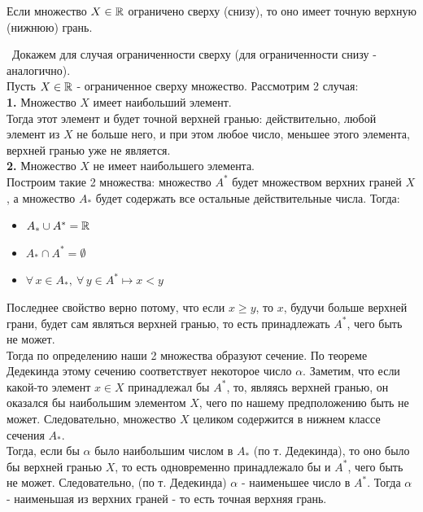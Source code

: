 \begin{theorem}
    Если множество \(X\in\mathbb{R}\) ограничено сверху (снизу), 
    то оно имеет точную верхную (нижнюю) грань.

    \vspace{2mm}

    \proofname~Докажем для случая ограниченности сверху (для ограниченности снизу - аналогично). \\
    Пусть \(X\in\mathbb{R}\) - ограниченное сверху множество. Рассмотрим 2 случая: \\
        \indent \textbf{1.} Множество \(X\) имеет наибольший элемент. \\
        Тогда этот элемент и будет точной верхней гранью: действительно,
        любой элемент из \(X\) не больше него, и при этом любое число,
        меньшее этого элемента, верхней гранью уже не является.\\
        \indent \textbf{2.} Множество \(X\) не имеет наибольшего элемента.\\
        Построим такие 2 множества: множество \(A^{*}\) будет множеством верхних граней \(X\),
        а множество \(A_{*}\) будет содержать все остальные действительные числа. Тогда:
        \begin{itemize}
            \item \(A_{*} \cup A^{*} = \mathbb{R}\)
            \item \(A_{*} \cap A^{*} = \emptyset\)
            \item \(\forall\,x\in A_{*},~\forall\,y\in A^{*} \longmapsto x < y\)
        \end{itemize}
        Последнее свойство верно потому, что если \(x\geq y\), то \(x\), 
        будучи больше верхней грани, будет сам являться верхней гранью,
        то есть принадлежать \(A^{*}\), чего быть не может.\\
        Тогда по определению наши 2 множества образуют сечение.
        По теореме Дедекинда этому сечению соответствует некоторое число \(\alpha\).
        Заметим, что если какой-то элемент \(x\in X\) принадлежал бы \(A^{*}\),
        то, являясь верхней гранью, он оказался бы наибольшим элементом \(X\),
        чего по нашему предположению быть не может.
        Следовательно, множество \(X\) целиком содержится в нижнем классе сечения \(A_{*}\).\\
        Тогда, если бы \(\alpha\) было наибольшим числом в \(A_{*}\) (по т. Дедекинда),
        то оно было бы верхней гранью \(X\), то есть одновременно принадлежало бы и \(A^{*}\),
        чего быть не может.
        Следовательно, (по т. Дедекинда) \(\alpha\) - наименьшее число в \(A^{*}\).
        Тогда \(\alpha\) - наименьшая из верхних граней - то есть точная верхняя грань.~\qedsymbol
\end{theorem}

